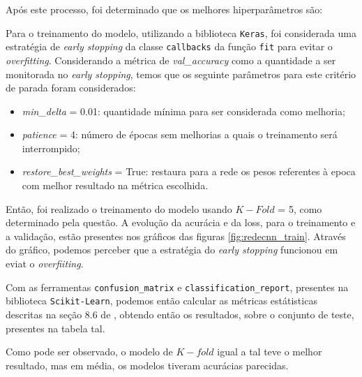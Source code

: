 \documentclass[]{abntex2}
\begin{document}
Após este processo, foi determinado que os melhores hiperparâmetros são:


Para o treinamento do modelo, utilizando a biblioteca \texttt{Keras}, foi considerada uma estratégia de \textit{early stopping} da classe \texttt{callbacks} da função \texttt{fit} para evitar o \textit{overfitting}. Considerando a métrica de \textit{val\_accuracy}  como a quantidade a ser monitorada no \textit{early stopping}, temos que os seguinte parâmetros para este critério de parada foram considerados:

\begin{itemize}
    \item \textit{min\_delta} = 0.01:  quantidade mínima para ser considerada como melhoria;
    \item \textit{patience} = 4: número de épocas sem melhorias a quais o treinamento será interrompido;
    \item \textit{restore\_best\_weights} = True: restaura para a rede os pesos referentes à epoca com melhor resultado na métrica escolhida.
\end{itemize}

Então, foi realizado o treinamento do modelo usando $K-Fold$ = 5, como determinado pela questão. A evolução da acurácia e da loss, para o treinamento e a validação, estão presentes nos gráficos das figuras \ref*{fig:redecnn_train}. Através do gráfico, podemos perceber que a estratégia do \textit{early stopping} funcionou em eviat o \textit{overfiiting}.

Com as ferramentas \texttt{confusion\_matrix} e \texttt{classification\_report}, presentes na biblioteca \texttt{Scikit-Learn}, podemos então calcular as métricas estátisticas descritas na seção 8.6 de \cite{book}, obtendo então os resultados, sobre o conjunto de teste, presentes na tabela tal.

Como pode ser observado, o modelo de $K-fold$ igual a tal teve o melhor resultado, mas em média, os modelos tiveram acurácias parecidas.

\end{document}
